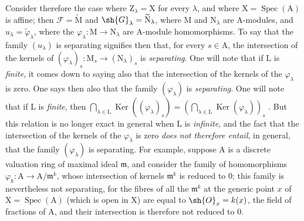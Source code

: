 \begin{env}[11.9.4]
\label{IV.11.9.4}
Consider therefore the case where $\mathrm{Z}_\lambda=\mathrm{X}$ for every $\lambda$, and where $\mathrm{X}=\operatorname{Spec}(\mathrm{A})$ is affine; then $\mathscr{F}=\widetilde{\mathrm{M}}$ and $\sh{G}_\lambda=\widetilde{\mathrm{N}}_\lambda$, where $\mathrm{M}$ and $\mathrm{N}_\lambda$ are $\mathrm{A}$-modules, and $u_\lambda=\widetilde{\varphi}_\lambda$, where the $\varphi_\lambda:\mathrm{M}\to\mathrm{N}_\lambda$ are $\mathrm{A}$-module homomorphisms.
To say that the family $(u_\lambda)$ is separating signifies then that, for every $s\in\mathrm{A}$, the intersection of the kernels of $(\varphi_\lambda)_s:\mathrm{M}_s\to(\mathrm{N}_\lambda)_s$ is \emph{separating}.
One will note that if $\mathrm{L}$ is \emph{finite}, it comes down to saying also that the intersection of the kernels of the $\varphi_\lambda$ is zero.
One says then also that the family $(\varphi_\lambda)$ is \emph{separating}.
One will note that if $\mathrm{L}$ is \emph{finite}, then $\bigcap_{\lambda\in\mathrm{L}}\operatorname{Ker}((\varphi_\lambda)_s)=(\bigcap_{\lambda\in\mathrm{L}}\operatorname{Ker}(\varphi_\lambda))_s$ .
But this relation is no longer exact in general
when $\mathrm{L}$ is \emph{infinite}, and the fact that the intersection of the kernels of the $\varphi_\lambda$ is zero \emph{does not therefore entail},
in general, that the family $(\varphi_\lambda)$ is separating.
For example, suppose $\mathrm{A}$ is a discrete valuation ring of maximal ideal $\mathfrak{m}$, and consider the family of homomorphisms $\varphi_k:\mathrm{A}\to\mathrm{A}/\mathfrak{m}^k$, whose intersection of kernels $\mathfrak{m}^k$ is reduced to $0$; this family is nevertheless not separating, for the fibres of all the $\mathfrak{m}^k$ at the generic point $x$ of $\mathrm{X}=\operatorname{Spec}(\mathrm{A})$ (which is open in $\mathrm{X}$) are equal to $\sh{O}_x=k(x)$, the field of fractions of $\mathrm{A}$, and their intersection is therefore not reduced to $0$.
\end{env}

